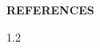 \documentclass[12pt,a4paper]{report}
\begin{document}
\clearpage
{}
{}
\begin{center}
{\normalfont\bfseries\fontsize{14}{21}\selectfont REFERENCES}
\end{center}

\begingroup
\renewcommand{\chapter}[2]{}  %
\begin{spacing}{1.2}


\end{spacing}
\endgroup
\end{document}
